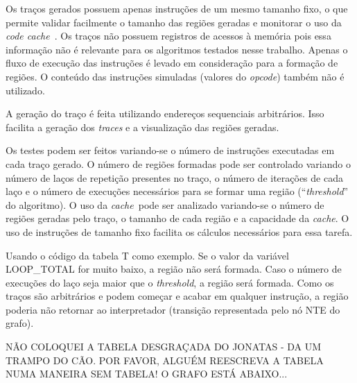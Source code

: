 \documentclass[12pt,twoside]{article}
\newcommand{\ccache}{\emph{code cache}}
\newcommand{\cache}{\emph{cache}}
\newcommand{\qq}[1]{``#1''}
\begin{document}
Os traços gerados possuem apenas instruções de um mesmo tamanho fixo, o que permite validar facilmente o tamanho das regiões geradas e monitorar o uso da \ccache~. Os traços não possuem registros de acessos à memória pois essa informação não é relevante para os algoritmos testados nesse trabalho. Apenas o fluxo de execução das instruções é levado em consideração para a formação de regiões. O conteúdo das instruções simuladas (valores do \emph{opcode}) também não é utilizado. 

A geração do traço é feita utilizando endereços sequenciais arbitrários. Isso facilita a geração dos \emph{traces} e a visualização das regiões geradas.

Os testes podem ser feitos variando-se o número de instruções executadas em cada traço gerado. O número de regiões formadas pode ser controlado variando o número de laços de repetição presentes no traço, o número de iterações de cada laço e o número de execuções necessários para se formar uma região (\qq{\emph{threshold}} do algoritmo). O uso da \cache~pode ser analizado variando-se o número de regiões geradas pelo traço, o tamanho de cada região e a capacidade da \cache. O uso de instruções de tamanho fixo facilita os cálculos necessários para essa tarefa.

Usando o código da tabela T como exemplo. Se o valor da variável LOOP\_TOTAL for muito baixo, a região não será formada. Caso o número de execuções do laço seja maior que o \emph{threshold}, a região será formada. Como os traços são arbitrários e podem começar e acabar em qualquer instrução, a região poderia não retornar ao interpretador (transição representada pelo nó NTE do grafo). 

\begin{large}
NÃO COLOQUEI A TABELA DESGRAÇADA DO JONATAS - DA UM TRAMPO DO CÃO. POR FAVOR, ALGUÉM REESCREVA A TABELA NUMA MANEIRA SEM TABELA! O GRAFO ESTÁ ABAIXO...
\end{large}
\end{document}
